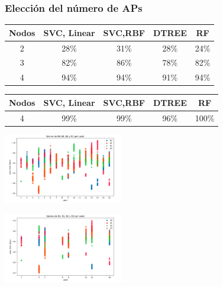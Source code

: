 \documentclass{beamer}
\begin{document}
\begin{frame}
\frametitle{Elección del número de APs}
\centering

\begin{table}[H]
\begin{center}
\begin{tabular}{|c|c|c|c|c|}
\hline
\textbf{Nodos} & \textbf{SVC, Linear} & \textbf{SVC,RBF} & \textbf{DTREE} & \textbf{RF} \\
\hline
2 & 28\% & 31\% & 28\% & 24\% \\  
3 & 82\% & 86\% & 78\% & 82\% \\   
4 & 94\% & 94\% & 91\% & 94\% \\   
\hline
\end{tabular}
\label{cuadro:tabla2}
\end{center}
\end{table}

\begin{table}[H]
\begin{center}
\begin{tabular}{|c|c|c|c|c|}
\hline
\textbf{Nodos} & \textbf{SVC, Linear} & \textbf{SVC,RBF} & \textbf{DTREE} & \textbf{RF} \\
\hline
4 & 99\% & 99\% & 96\% & 100\% \\  
\hline
\end{tabular}
\label{cuadro:tabla3}
\end{center}
\end{table}

\begin{minipage}{0.45\textwidth}
    \centering
    \includegraphics[width=5.2cm]{figs/vals1.png}
\end{minipage}
\hfill
\begin{minipage}{0.45\textwidth}
    \centering
    \includegraphics[width=5.2cm]{figs/vals2.png}
\end{minipage}

\vspace{0.3cm} %
\end{frame}
\end{document}
